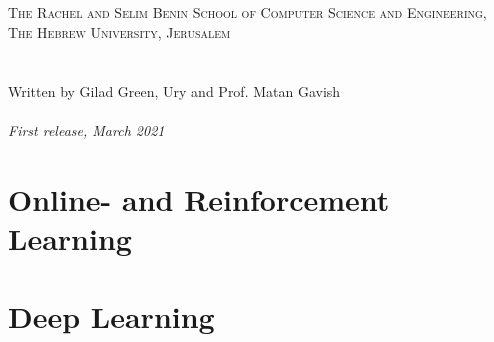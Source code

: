 \documentclass[11pt]{book} %
\begin{document}
\newpage
~\vfill
\thispagestyle{empty}
\textsc{\\\\ The Rachel and Selim Benin School of Computer Science and Engineering, The Hebrew University, Jerusalem}\\\\\\
Written by Gilad Green, Ury  and Prof. Matan Gavish\\\\
\textit{First release, March 2021} %


\pagestyle{empty} %
\tableofcontents %
\cleardoublepage %
\pagestyle{fancy} %







    




\chapter{Online- and Reinforcement Learning}
\label{chap:online}
\chapter{Deep Learning}

\newpage
\end{document}
